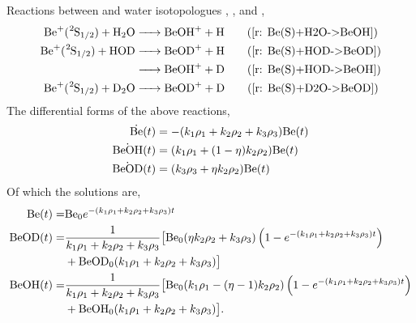 Reactions between  and water isotopologues , , and ,
\begin{align*}
	\ce{Be+(^2S1/2) + H2O & -> BeOH+ + H} \tag{\ref{r: Be(S)+H2O->BeOH}} \\
	\ce{Be+(^2S1/2) + HOD & -> BeOD+ + H} \tag{\ref{r: Be(S)+HOD->BeOD}} \\
	\ce{& -> BeOH+ + D} \tag{\ref{r: Be(S)+HOD->BeOH}} \\
	\ce{Be+(^2S1/2) + D2O & -> BeOD+ + D} \tag{\ref{r: Be(S)+D2O->BeOD}}
\end{align*}
The differential forms of the above reactions,
\begin{align*}
	\dot{\ce{Be}}(t) & = -(k_1\rho_1+k_2\rho_2+k_3\rho_3)\ce{Be}(t)\\
	\dot{\ce{BeOH}}(t) & = (k_1\rho_1+(1-\eta)k_2\rho_2)\ce{Be}(t)\\
	\dot{\ce{BeOD}}(t) & = (k_3\rho_3+\eta k_2\rho_2)\ce{Be}(t)
\end{align*}
Of which the solutions are,
\begin{align}
	\ce{Be}(t) = &  \ce{Be0} e^{-(k_1 \rho_1+k_2 \rho_2+k_3 \rho_3)t} \label{eq: HOD Be(t)} \\
	\ce{BeOD}(t) = & \frac{1}{k_1 \rho_1+k_2 \rho_2+k_3 \rho_3} \big[\ce{Be0} (\eta k_2 \rho_2+k_3 \rho_3) \left(1-e^{-(k_1 \rho_1+k_2 \rho_2+k_3 \rho_3)t}\right) \label{eq: HOD BeOD(t)} \\
	& +\ce{BeOD0} (k_1 \rho_1+k_2 \rho_2+k_3 \rho_3)\big] \\
	\ce{BeOH}(t) = & \frac{1}{k_1 \rho_1+k_2 \rho_2+k_3 \rho_3}\big[\ce{Be0} (k_1 \rho_1-(\eta-1) k_2 \rho_2) \left(1 - e^{-(k_1 \rho_1+k_2 \rho_2+k_3 \rho_3)t}\right) \\
	& + \ce{BeOH0} (k_1 \rho_1+k_2 \rho_2+k_3 \rho_3)\big]. \label{eq: HOD BeOH(t)}
\end{align}

\section{} \label{sec: C+H2O eqs}

